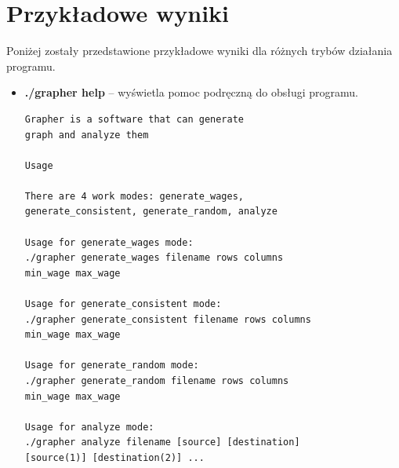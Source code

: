\documentclass{article}
\begin{document}
\newpage
\section{Przykładowe wyniki}

Poniżej zostały przedstawione przykładowe wyniki dla różnych trybów działania programu.

\medskip
\begin{itemize}
\item \textbf{./grapher help} -- wyświetla pomoc podręczną do obsługi programu.
\vspace{5mm}
\\
\begin{lstlisting}
Grapher is a software that can generate 
graph and analyze them

Usage

There are 4 work modes: generate_wages, 
generate_consistent, generate_random, analyze

Usage for generate_wages mode:
./grapher generate_wages filename rows columns
min_wage max_wage

Usage for generate_consistent mode:
./grapher generate_consistent filename rows columns 
min_wage max_wage

Usage for generate_random mode:
./grapher generate_random filename rows columns 
min_wage max_wage

Usage for analyze mode:
./grapher analyze filename [source] [destination] 
[source(1)] [destination(2)] ...

\end{lstlisting}


\end{itemize}
\end{document}
